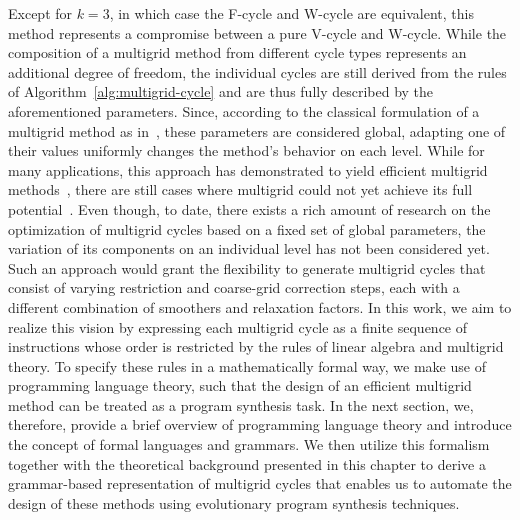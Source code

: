 Except for $k = 3$, in which case the F-cycle and W-cycle are equivalent, this method represents a compromise between a pure V-cycle and W-cycle.
While the composition of a multigrid method from different cycle types represents an additional degree of freedom, the individual cycles are still derived from the rules of Algorithm~\ref{alg:multigrid-cycle} and are thus fully described by the aforementioned parameters.
Since, according to the classical formulation of a multigrid method as in~\cite{brandt1977multi,hackbusch2013multi,trottenberg2000multigrid,briggs2000multigrid}, these parameters are considered global, adapting one of their values uniformly changes the method's behavior on each level. 
While for many applications, this approach has demonstrated to yield efficient multigrid methods~\cite{trottenberg2000multigrid}, there are still cases where multigrid could not yet achieve its full potential~\cite{ernst2012difficult,benzi2005numerical}.
Even though, to date, there exists a rich amount of research on the optimization of multigrid cycles based on a fixed set of global parameters, the variation of its components on an individual level has not been considered yet.
Such an approach would grant the flexibility to generate multigrid cycles that consist of varying restriction and coarse-grid correction steps, each with a different combination of smoothers and relaxation factors.
In this work, we aim to realize this vision by expressing each multigrid cycle as a finite sequence of instructions whose order is restricted by the rules of linear algebra and multigrid theory.
To specify these rules in a mathematically formal way, we make use of programming language theory, such that the design of an efficient multigrid method can be treated as a program synthesis task.
In the next section, we, therefore, provide a brief overview of programming language theory and introduce the concept of formal languages and grammars.
We then utilize this formalism together with the theoretical background presented in this chapter to derive a grammar-based representation of multigrid cycles that enables us to automate the design of these methods using evolutionary program synthesis techniques.